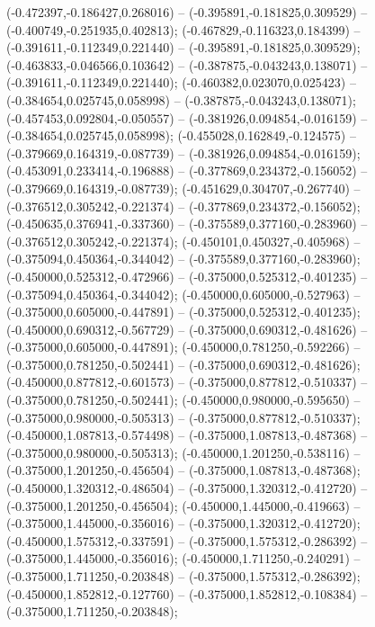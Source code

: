  (-0.472397,-0.186427,0.268016) -- (-0.395891,-0.181825,0.309529) -- (-0.400749,-0.251935,0.402813);
 (-0.467829,-0.116323,0.184399) -- (-0.391611,-0.112349,0.221440) -- (-0.395891,-0.181825,0.309529);
 (-0.463833,-0.046566,0.103642) -- (-0.387875,-0.043243,0.138071) -- (-0.391611,-0.112349,0.221440);
 (-0.460382,0.023070,0.025423) -- (-0.384654,0.025745,0.058998) -- (-0.387875,-0.043243,0.138071);
 (-0.457453,0.092804,-0.050557) -- (-0.381926,0.094854,-0.016159) -- (-0.384654,0.025745,0.058998);
 (-0.455028,0.162849,-0.124575) -- (-0.379669,0.164319,-0.087739) -- (-0.381926,0.094854,-0.016159);
 (-0.453091,0.233414,-0.196888) -- (-0.377869,0.234372,-0.156052) -- (-0.379669,0.164319,-0.087739);
 (-0.451629,0.304707,-0.267740) -- (-0.376512,0.305242,-0.221374) -- (-0.377869,0.234372,-0.156052);
 (-0.450635,0.376941,-0.337360) -- (-0.375589,0.377160,-0.283960) -- (-0.376512,0.305242,-0.221374);
 (-0.450101,0.450327,-0.405968) -- (-0.375094,0.450364,-0.344042) -- (-0.375589,0.377160,-0.283960);
 (-0.450000,0.525312,-0.472966) -- (-0.375000,0.525312,-0.401235) -- (-0.375094,0.450364,-0.344042);
 (-0.450000,0.605000,-0.527963) -- (-0.375000,0.605000,-0.447891) -- (-0.375000,0.525312,-0.401235);
 (-0.450000,0.690312,-0.567729) -- (-0.375000,0.690312,-0.481626) -- (-0.375000,0.605000,-0.447891);
 (-0.450000,0.781250,-0.592266) -- (-0.375000,0.781250,-0.502441) -- (-0.375000,0.690312,-0.481626);
 (-0.450000,0.877812,-0.601573) -- (-0.375000,0.877812,-0.510337) -- (-0.375000,0.781250,-0.502441);
 (-0.450000,0.980000,-0.595650) -- (-0.375000,0.980000,-0.505313) -- (-0.375000,0.877812,-0.510337);
 (-0.450000,1.087813,-0.574498) -- (-0.375000,1.087813,-0.487368) -- (-0.375000,0.980000,-0.505313);
 (-0.450000,1.201250,-0.538116) -- (-0.375000,1.201250,-0.456504) -- (-0.375000,1.087813,-0.487368);
 (-0.450000,1.320312,-0.486504) -- (-0.375000,1.320312,-0.412720) -- (-0.375000,1.201250,-0.456504);
 (-0.450000,1.445000,-0.419663) -- (-0.375000,1.445000,-0.356016) -- (-0.375000,1.320312,-0.412720);
 (-0.450000,1.575312,-0.337591) -- (-0.375000,1.575312,-0.286392) -- (-0.375000,1.445000,-0.356016);
 (-0.450000,1.711250,-0.240291) -- (-0.375000,1.711250,-0.203848) -- (-0.375000,1.575312,-0.286392);
 (-0.450000,1.852812,-0.127760) -- (-0.375000,1.852812,-0.108384) -- (-0.375000,1.711250,-0.203848);
